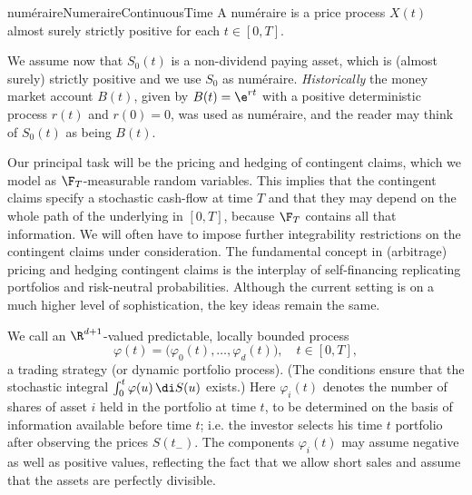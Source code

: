 \begin{defn}{num\'{e}raire}{NumeraireContinuousTime}
	A num\'{e}raire is a price process $X(t)$ almost surely strictly positive for each $t \in [0, T]$.
\end{defn}

We assume now that $S_0(t)$ is a non-dividend paying asset, which is (almost surely) strictly positive and we use $S_0$ as num\'{e}raire. \emph{Historically} the money market account $B(t)$, given by $B(t) = \e^{rt}$ with a positive deterministic process $r(t)$ and $r(0) = 0$, was used as num\'{e}raire, and the reader may think of $S_0(t)$ as being $B(t)$.

Our principal task will be the pricing and hedging of contingent claims, which we model as $\F_T$-measurable random variables. This implies that the contingent claims specify a stochastic cash-flow at time $T$ and that they may depend on the whole path of the underlying in $[0,T]$, because $\F_T$ contains all that information. We will often have to impose further integrability restrictions on the contingent claims under consideration. The fundamental concept in (arbitrage) pricing and hedging contingent claims is the interplay of self-financing replicating portfolios and risk-neutral probabilities. Although the current setting is on a much higher level of sophistication, the key ideas remain the same.

We call an $\R^{d+1}$-valued predictable, locally bounded process
\[
	\varphi(t) = \bigl(\varphi_0(t),\dots,\varphi_d(t)\bigr), \quad t \in [0,T],
\]
a trading strategy (or dynamic portfolio process). (The conditions ensure that the stochastic integral $\int_{0}^{t} \varphi(u)\,\di S(u)$ exists.) Here $\varphi_i(t)$ denotes the number of shares of asset $i$ held in the portfolio at time $t$, to be determined on the basis of information available before time $t$; i.e. the investor selects his time $t$ portfolio after observing the prices $S(t_{-})$. The components $\varphi_i(t)$ may assume negative as well as positive values, reflecting the fact that we allow short sales and assume that the assets are perfectly divisible.

